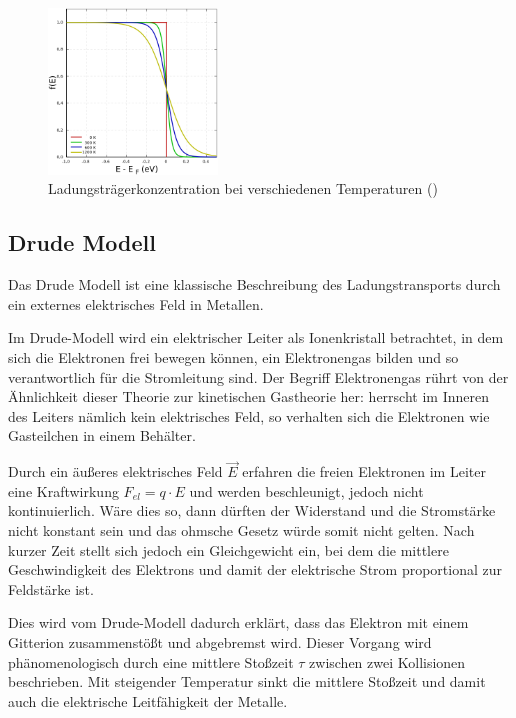 \begin{figure}[H]
    \centering
    \includegraphics[width=0.4\textwidth]{fig/fermi}
    \caption{Ladungstr\"agerkonzentration bei verschiedenen Temperaturen ()}
    \label{fig:fermi2}
\end{figure}

\subsection{Drude Modell }\label{k3:drude}

Das Drude Modell ist eine klassische Beschreibung des Ladungstransports durch ein externes elektrisches Feld in Metallen.

Im Drude-Modell wird ein elektrischer Leiter als Ionenkristall betrachtet, in dem sich die Elektronen frei bewegen können, ein Elektronengas bilden und so verantwortlich für die Stromleitung sind. Der Begriff Elektronengas rührt von der Ähnlichkeit dieser Theorie zur kinetischen Gastheorie her: herrscht im Inneren des Leiters nämlich kein elektrisches Feld, so verhalten sich die Elektronen wie Gasteilchen in einem Behälter.

Durch ein äußeres elektrisches Feld $\vec {E}$ erfahren die freien Elektronen im Leiter eine Kraftwirkung $F_{el} = q \cdot E$ und werden beschleunigt, jedoch nicht kontinuierlich. Wäre dies so, dann dürften der Widerstand und die Stromstärke nicht konstant sein und das ohmsche Gesetz würde somit nicht gelten. Nach kurzer Zeit stellt sich jedoch ein Gleichgewicht ein, bei dem die mittlere Geschwindigkeit des Elektrons und damit der elektrische Strom proportional zur Feldstärke ist.

Dies wird vom Drude-Modell dadurch erklärt, dass das Elektron mit einem Gitterion zusammenstößt und abgebremst wird. Dieser Vorgang wird phänomenologisch durch eine mittlere Stoßzeit $\tau$ zwischen zwei Kollisionen beschrieben. Mit steigender Temperatur sinkt die mittlere Stoßzeit und damit auch die elektrische Leitfähigkeit der Metalle.


